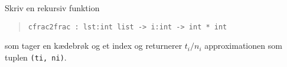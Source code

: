 Skriv en rekursiv funktion
  \begin{quote}
    \lstinline{cfrac2frac : lst:int list -> i:int -> int * int}
  \end{quote}
  som tager en kædebrøk og et index og returnerer $t_i/n_i$ approximationen som tuplen \lstinline{(ti, ni)}. 